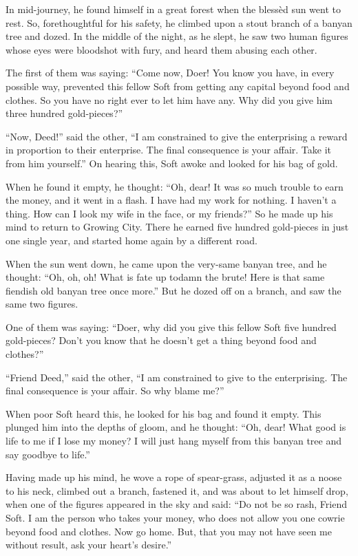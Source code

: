 \documentclass[article, twoside, 14pt]{memoir}
\begin{document}
In mid-journey, he found himself in a great forest when the blessèd
sun went to rest. So, forethoughtful for his safety, he climbed
upon a stout branch of a banyan tree and dozed. In the middle of
the night, as he slept, he saw two human figures whose eyes were
bloodshot with fury, and heard them abusing each other.

The first of them was saying:
``Come now, Doer! You know you have, in every possible way, prevented this fellow Soft from getting any capital beyond food and clothes. So you have no right ever to let him have any. Why did you give him three hundred gold-pieces?''

``Now, Deed!'' said the other,
``I am constrained to give the enterprising a reward in proportion to their enterprise. The final consequence is your affair. Take it from him yourself.''
On hearing this, Soft awoke and looked for his bag of gold.

When he found it empty, he thought:
``Oh, dear! It was so much trouble to earn the money, and it went in a flash. I have had my work for nothing. I haven't a thing. How can I look my wife in the face, or my friends?''
So he made up his mind to return to Growing City. There he earned
five hundred gold-pieces in just one single year, and started home
again by a different road.

When the sun went down, he came upon the very-same banyan tree, and
he thought:
``Oh, oh, oh! What is fate up to{\textemdash}damn the brute! Here is that same fiendish old banyan tree once more.''
But he dozed off on a branch, and saw the same two figures.

One of them was saying:
``Doer, why did you give this fellow Soft five hundred gold-pieces? Don't you know that he doesn't get a thing beyond food and clothes?''

``Friend Deed,'' said the other,
``I am constrained to give to the enterprising. The final consequence is your affair. So why blame me?''

When poor Soft heard this, he looked for his bag and found it
empty. This plunged him into the depths of gloom, and he thought:
``Oh, dear! What good is life to me if I lose my money? I will just hang myself from this banyan tree and say goodbye to life.''

Having made up his mind, he wove a rope of spear-grass, adjusted it
as a noose to his neck, climbed out a branch, fastened it, and was
about to let himself drop, when one of the figures appeared in the
sky and said:
``Do not be so rash, Friend Soft. I am the person who takes your money, who does not allow you one cowrie beyond food and clothes. Now go home. But, that you may not have seen me without result, ask your heart's desire.''
\end{document}
